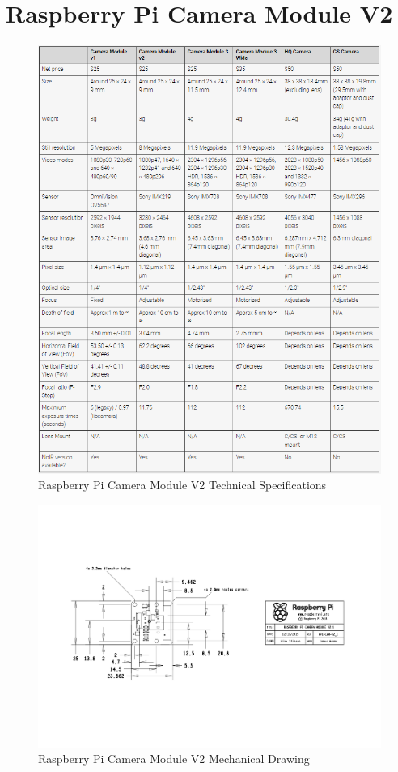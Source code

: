 \section{Raspberry Pi Camera Module V2}

\begin{figure}[H]
    \centering
    \includegraphics[width=0.85\linewidth]{texs/appendix/data/techspecs/cameraspecs.png}
    \caption{Raspberry Pi Camera Module V2 Technical Specifications}
    \label{fig:picam-1}
\end{figure}

\begin{figure}[H]
    \centering
    \includegraphics[width=\linewidth, angle=90]{texs/appendix/data/techspecs/cameramechdraw.jpg}
    \caption{Raspberry Pi Camera Module V2 Mechanical Drawing}
    \label{fig:picam-2}
\end{figure}

